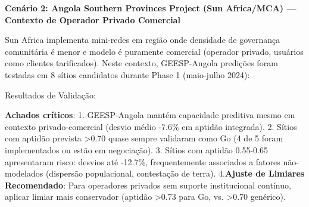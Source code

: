 \documentclass[12pt, a4paper]{article}
\begin{document}
\textbf{Cenário 2: Angola Southern Provinces Project (Sun Africa/MCA) — Contexto de Operador Privado Comercial}

Sun Africa implementa mini-redes em região onde densidade de governança comunitária é menor e modelo é puramente comercial (operador privado, usuários como clientes tarificados). Neste contexto, GEESP-Angola predições foram testadas em 8 sítios candidatos durante Phase 1 (maio-julho 2024):

Resultados de Validação:
\begin{table}[H]
\centering
\caption{Validação de Previsões GEESP em Sítios Sun Africa (n=8)}
\label{tab:geesp_validation_sun}
\footnotesize
{}
\end{table}\textbf{Achados críticos}:
1. GEESP-Angola mantém capacidade preditiva mesmo em contexto privado-comercial (desvio médio -7.6\% em aptidão integrada).
2. Sítios com aptidão prevista >0.70 quase sempre validaram como Go (4 de 5 foram implementados ou estão em negociação).
3. Sítios com aptidão 0.55-0.65 apresentaram risco: desvios até -12.7\%, frequentemente associados a fatores não-modelados (dispersão populacional, contestação de terra).
4.\textbf{Ajuste de Limiares Recomendado}: Para operadores privados sem suporte institucional contínuo, aplicar limiar mais conservador (aptidão >0.73 para Go, vs. >0.70 genérico).
\end{document}
